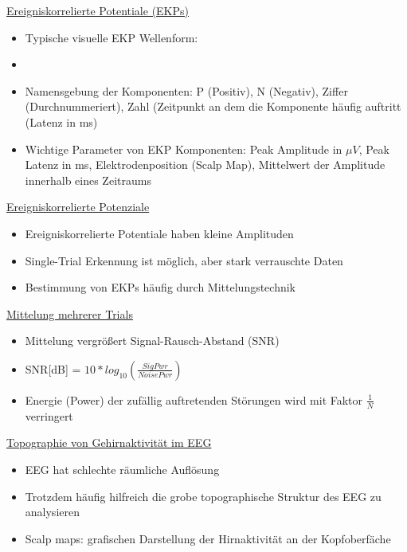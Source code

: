 \documentclass[a4paper,10pt,oneside]{article}
\begin{document}
\underline{Ereigniskorrelierte Potentiale (EKPs)} \\
	\begin{itemize}
		\item Typische visuelle EKP Wellenform:
		\item[] %
		\item Namensgebung der Komponenten: P (Positiv), N (Negativ), Ziffer (Durchnummeriert), Zahl (Zeitpunkt an dem die Komponente häufig auftritt (Latenz in ms)
		\item Wichtige Parameter von EKP Komponenten: Peak Amplitude in $\mu V$, Peak Latenz in ms, Elektrodenposition (Scalp Map), Mittelwert der Amplitude innerhalb eines Zeitraums
	\end{itemize}
	
\underline{Ereigniskorrelierte Potenziale} \\ 
	\begin{itemize}
		\item Ereigniskorrelierte Potentiale haben kleine Amplituden
		\item Single-Trial Erkennung ist möglich, aber stark verrauschte Daten
		\item Bestimmung von EKPs häufig durch Mittelungstechnik
	\end{itemize}

\underline{Mittelung mehrerer Trials} \\
	
	\begin{itemize}
		\item Mittelung vergrößert Signal-Rausch-Abstand (SNR)
		\item SNR[dB] = $10 * log_{10} (\frac{SigPwr}{NoisePwr})$
		\item Energie (Power) der zufällig auftretenden Störungen wird mit Faktor $\frac{1}{N}$ verringert 
	\end{itemize}
	
\underline{Topographie von Gehirnaktivität im EEG} \\
	\begin{itemize}
		\item EEG hat schlechte räumliche Auflösung
		\item Trotzdem häufig hilfreich die grobe topographische Struktur des EEG zu analysieren
		\item Scalp maps: grafischen Darstellung der Hirnaktivität an der Kopfoberfäche
	\end{itemize}
	
\end{document}
